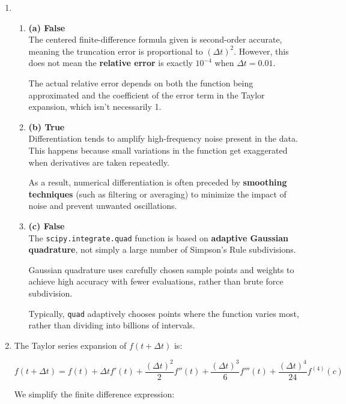 \documentclass[12pt]{article}
\begin{document}
\begin{enumerate}
\item 
\begin{enumerate}
     \item \textbf{(a) False} \\
    The centered finite-difference formula given is second-order accurate, meaning the truncation error is proportional to \( (\Delta t)^2 \). However, this does not mean the \textbf{relative error} is exactly \( 10^{-4} \) when \( \Delta t = 0.01 \). 
    
    The actual relative error depends on both the function being approximated and the coefficient of the error term in the Taylor expansion, which isn't necessarily 1.

    \item \textbf{(b) True} \\
    Differentiation tends to amplify high-frequency noise present in the data. This happens because small variations in the function get exaggerated when derivatives are taken repeatedly.

    As a result, numerical differentiation is often preceded by \textbf{smoothing techniques} (such as filtering or averaging) to minimize the impact of noise and prevent unwanted oscillations.

    \item \textbf{(c) False} \\
    The \texttt{scipy.integrate.quad} function is based on \textbf{adaptive Gaussian quadrature}, not simply a large number of Simpson's Rule subdivisions.

    Gaussian quadrature uses carefully chosen sample points and weights to achieve high accuracy with fewer evaluations, rather than brute force subdivision.

    Typically, \texttt{quad} adaptively chooses points where the function varies most, rather than dividing into billions of intervals.
\end{enumerate}

\item 
The Taylor series expansion of $f(t+\Delta t)$ is:

\begin{equation}
    f(t+ \Delta t) = f(t) + \Delta t f'(t) + \frac{(\Delta t)^2}{2} f''(t) + \frac{(\Delta t)^3}{6} f'''(t) + \frac{(\Delta t)^4}{24} f^{(4)}(c)
\end{equation}

We simplify the finite difference expression:


\end{enumerate}
\end{document}
